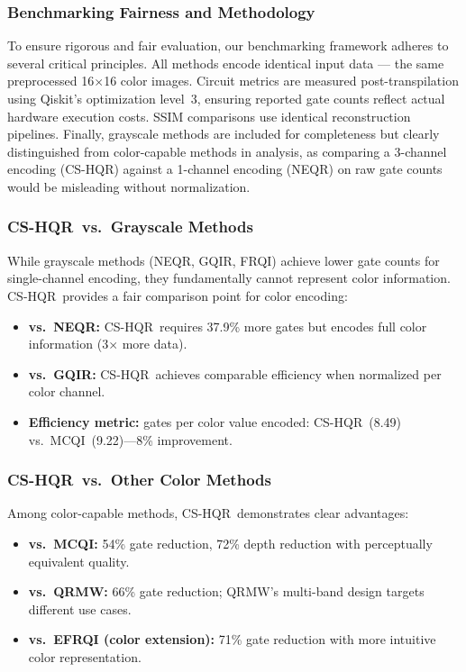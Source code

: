 \documentclass{ipol}
\newcommand{\cshqr}{\textsc{CS-HQR}}
\newcommand{\frqi}{\textsc{FRQI}}
\newcommand{\neqr}{\textsc{NEQR}}
\newcommand{\gqir}{\textsc{GQIR}}
\newcommand{\mcqi}{\textsc{MCQI}}
\begin{document}
\FloatBarrier
\subsubsection{Benchmarking Fairness and Methodology}

To ensure rigorous and fair evaluation, our benchmarking framework adheres to
several critical principles. All methods encode identical input data --- the
same preprocessed 16$\times$16 color images. Circuit metrics are measured
post-transpilation using Qiskit's optimization level~3, ensuring reported
gate counts reflect actual hardware execution costs. SSIM comparisons use
identical reconstruction pipelines. Finally, grayscale methods are included
for completeness but clearly distinguished from color-capable methods in
analysis, as comparing a 3-channel encoding (\cshqr) against a 1-channel
encoding (\neqr) on raw gate counts would be misleading without normalization.

\FloatBarrier
\subsubsection{\cshqr\ vs.\ Grayscale Methods}

While grayscale methods (\neqr, \gqir, \frqi) achieve lower gate counts for
single-channel encoding, they fundamentally cannot represent color
information. \cshqr\ provides a fair comparison point for color encoding:
\begin{itemize}
  \item \textbf{vs.\ \neqr:} \cshqr\ requires 37.9\% more gates but encodes
    full color information (3$\times$ more data).
  \item \textbf{vs.\ \gqir:} \cshqr\ achieves comparable efficiency when
    normalized per color channel.
  \item \textbf{Efficiency metric:} gates per color value encoded:
    \cshqr\ (8.49) vs.\ \mcqi\ (9.22)---8\% improvement.
\end{itemize}

\FloatBarrier
\subsubsection{\cshqr\ vs.\ Other Color Methods}

Among color-capable methods, \cshqr\ demonstrates clear advantages:
\begin{itemize}
  \item \textbf{vs.\ \mcqi:} 54\% gate reduction, 72\% depth reduction with
    perceptually equivalent quality.
  \item \textbf{vs.\ QRMW:} 66\% gate reduction; QRMW's multi-band design
    targets different use cases.
  \item \textbf{vs.\ EFRQI (color extension):} 71\% gate reduction with more
    intuitive color representation.
\end{itemize}
\end{document}
